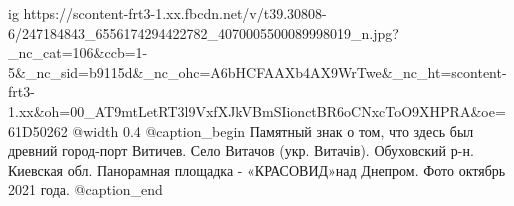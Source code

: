  
 
 
 
 

\ifcmt
  ig https://scontent-frt3-1.xx.fbcdn.net/v/t39.30808-6/247184843_6556174294422782_4070005500089998019_n.jpg?_nc_cat=106&ccb=1-5&_nc_sid=b9115d&_nc_ohc=A6bHCFAAXb4AX9WrTwe&_nc_ht=scontent-frt3-1.xx&oh=00_AT9mtLetRT3l9VxfXJkVBmSIionctBR6oCNxcToO9XHPRA&oe=61D50262
  @width 0.4
  @caption_begin
    Памятный знак о том, что здесь был древний город-порт Витичев.
    Село Витачов (укр. Витачів). Обуховский р-н. Киевская обл. 
    Панорамная площадка - «КРАСОВИД»над Днепром. Фото октябрь 2021 года.
  @caption_end
\fi
